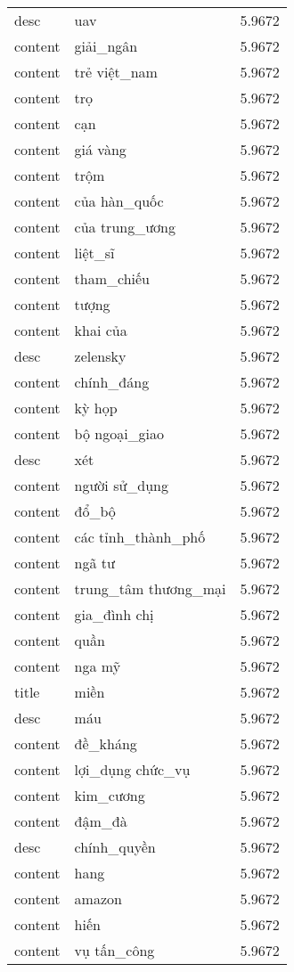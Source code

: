 \documentclass{article}
\begin{document}
\begin{tabular}{lll}
desc & uav & 5.9672\\
content & giải\_ngân & 5.9672\\
content & trẻ việt\_nam & 5.9672\\
content & trọ & 5.9672\\
content & cạn & 5.9672\\
content & giá vàng & 5.9672\\
content & trộm & 5.9672\\
content & của hàn\_quốc & 5.9672\\
content & của trung\_ương & 5.9672\\
content & liệt\_sĩ & 5.9672\\
content & tham\_chiếu & 5.9672\\
content & tượng & 5.9672\\
content & khai của & 5.9672\\
desc & zelensky & 5.9672\\
content & chính\_đáng & 5.9672\\
content & kỳ họp & 5.9672\\
content & bộ ngoại\_giao & 5.9672\\
desc & xét & 5.9672\\
content & người sử\_dụng & 5.9672\\
content & đổ\_bộ & 5.9672\\
content & các tỉnh\_thành\_phố & 5.9672\\
content & ngã tư & 5.9672\\
content & trung\_tâm thương\_mại & 5.9672\\
content & gia\_đình chị & 5.9672\\
content & quần & 5.9672\\
content & nga mỹ & 5.9672\\
title & miền & 5.9672\\
desc & máu & 5.9672\\
content & đề\_kháng & 5.9672\\
content & lợi\_dụng chức\_vụ & 5.9672\\
content & kim\_cương & 5.9672\\
content & đậm\_đà & 5.9672\\
desc & chính\_quyền & 5.9672\\
content & hang & 5.9672\\
content & amazon & 5.9672\\
content & hiến & 5.9672\\
content & vụ tấn\_công & 5.9672\\

\end{tabular}
\end{document}
